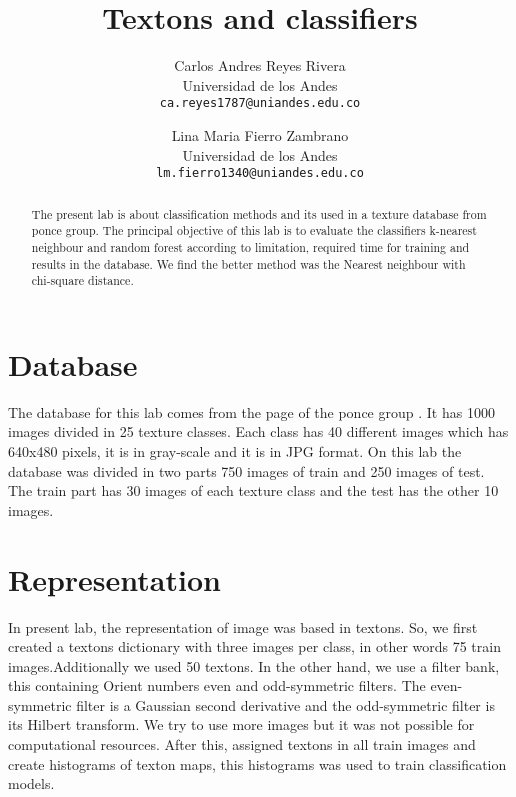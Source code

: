 \documentclass[10pt,twocolumn,letterpaper]{article}
\begin{document}
\title{Textons and classifiers }

\author{Carlos Andres Reyes Rivera\\
Universidad de los Andes\\
{\tt\small ca.reyes1787@uniandes.edu.co}
\and
Lina Maria Fierro Zambrano\\
Universidad de los Andes\\
{\tt\small lm.fierro1340@uniandes.edu.co}
}

\maketitle

\begin{abstract}

The present lab is about classification methods and its used in a texture database from ponce group. The principal objective of this lab is to evaluate the classifiers k-nearest neighbour and random forest according to limitation, required time for training and results in the database. We find the better method was the Nearest neighbour with chi-square distance.


\end{abstract}

\section{Database}

The database for this lab comes from the page of the ponce group \cite{1}. It has 1000 images divided in 25 texture classes. Each class has 40 different images which has 640x480 pixels, it is in gray-scale and it is in JPG format. On this lab the database was divided in two parts 750 images of train and 250 images of test. The train part has 30 images of each texture class and the test has the other 10 images.




\section{Representation}

In present lab, the representation of image was based in textons. So, we first created a textons dictionary with three images per class, in other words 75 train images.Additionally we used 50 textons. 
In the other hand, we use a filter bank, this containing Orient numbers even and odd-symmetric filters. The even-symmetric filter is a Gaussian second derivative and the odd-symmetric filter is its Hilbert transform. We try to use more images but it was not possible for computational resources. After this, assigned textons in all train images and create histograms of texton maps, this histograms was used to train classification models. 
\end{document}
